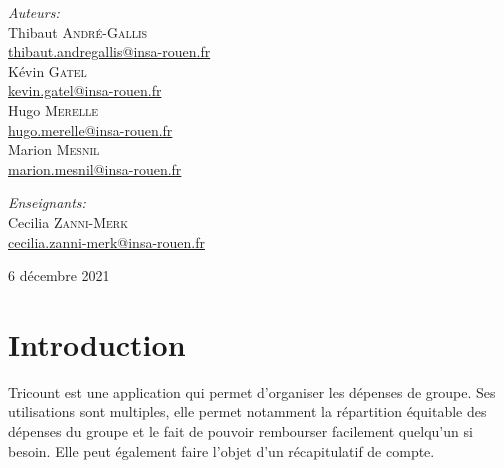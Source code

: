 \documentclass[12,french]{report}
\begin{document}
\begin{titlepage}
\begin{center}
	\begin{minipage}{0.4\textwidth}
		\begin{flushleft} \large
			\emph{Auteurs:}\\
			Thibaut \textsc{André-Gallis} \\
			{\small\href{mailto:thibaut.andregallis@insa-rouen.fr}{thibaut.andregallis@insa-rouen.fr}} \\
			Kévin \textsc{Gatel} \\
			{\small\href{mailto:kevin.gatel@insa-rouen.fr}{kevin.gatel@insa-rouen.fr}}\\
			Hugo \textsc{Merelle} \\
			{\small\href{mailto:hugo.merelle@insa-rouen.fr}{hugo.merelle@insa-rouen.fr}}\\
			Marion \textsc{Mesnil} \\
			{\small\href{mailto:marion.mesnil@insa-rouen.fr}{marion.mesnil@insa-rouen.fr}}\\
		\end{flushleft}
	\end{minipage}
	\begin{minipage}{0.4\textwidth}
		\begin{flushright} \large
			\emph{Enseignants:} \\
			Cecilia \textsc{Zanni-Merk} \\
			{\small\href{mailto:cecilia.zanni-merk@insa-rouen.fr}								{cecilia.zanni-merk@insa-rouen.fr}}\\
		\end{flushright}
	\end{minipage}

	\vfill
	{\large 6 décembre 2021}
\end{center}
\end{titlepage}

\tableofcontents
\listoffigures

\renewcommand{\chaptername}{}
\chapter*{Introduction}

Tricount est une application qui permet d'organiser les dépenses de groupe. Ses utilisations sont multiples, elle permet notamment la répartition équitable des dépenses du groupe et le fait de pouvoir rembourser facilement quelqu'un si besoin. Elle peut également faire l’objet d’un récapitulatif de compte.\\
\end{document}
